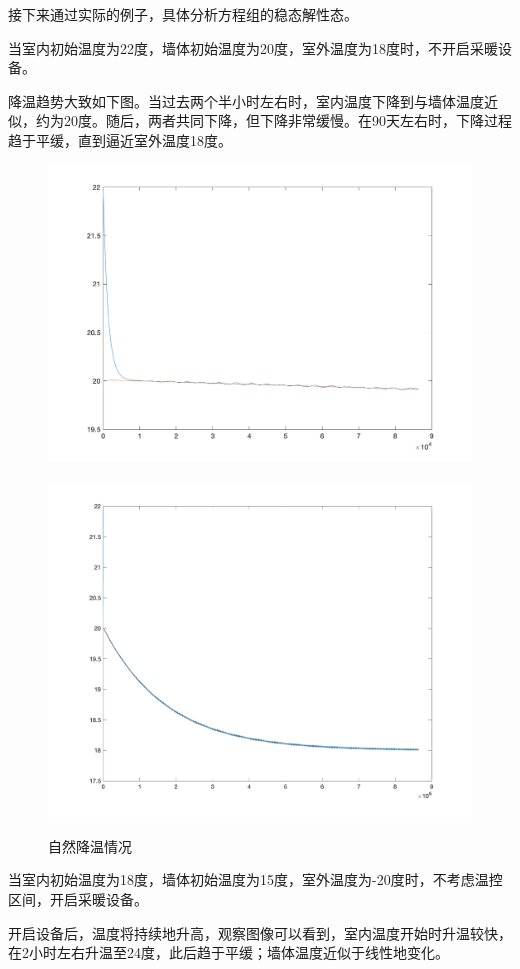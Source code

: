 \documentclass[withoutpreface,bwprint]{cumcmthesis} %
\begin{document}
接下来通过实际的例子，具体分析方程组的稳态解性态。
\begin{example}
    \label{exa:example}
当室内初始温度为22度，墙体初始温度为20度，室外温度为18度时，不开启采暖设备。
\end{example}
降温趋势大致如下图。当过去两个半小时左右时，室内温度下降到与墙体温度近似，约为20度。随后，两者共同下降，但下降非常缓慢。在90天左右时，下降过程趋于平缓，直到逼近室外温度18度。
\begin{figure}[h]
    \centering
    \begin{minipage}[c]{0.45\textwidth}
        \includegraphics[width=1\textwidth]{figures/1-2-1.png}
    \label{fig:my_label}
    \end{minipage}
    \begin{minipage}[c]{0.45\textwidth}
    \includegraphics[width=.9\textwidth]{figures/1-2.png}
    \label{fig:my_label}
\end{minipage}
\caption{自然降温情况}
\end{figure}
\begin{example}
    \label{exa:example}
当室内初始温度为18度，墙体初始温度为15度，室外温度为-20度时，不考虑温控区间，开启采暖设备。
\end{example}
开启设备后，温度将持续地升高，观察图像可以看到，室内温度开始时升温较快，在2小时左右升温至24度，此后趋于平缓；墙体温度近似于线性地变化。
\end{document}
